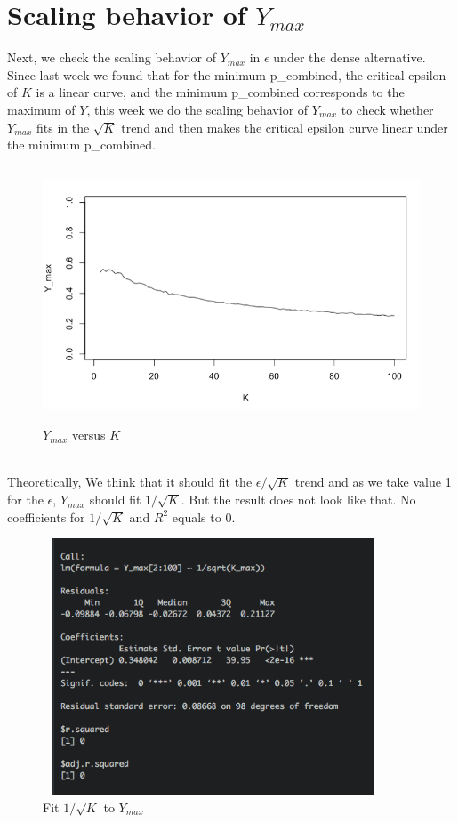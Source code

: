 \documentclass[10pt,english]{article}\usepackage{graphicx, color}
\numberwithin{equation}{section}
\numberwithin{figure}{section}
\begin{document}
\section{Scaling behavior of $Y_{max}$}
Next, we check the scaling behavior of $Y_{max}$ in $\epsilon$ under the dense alternative. Since last week we found that for the minimum p\_combined, the critical epsilon of $K$ is a linear curve, and the minimum p\_combined corresponds to the maximum of $Y$, this week we do the scaling behavior of $Y_{max}$ to check whether $Y_{max}$ fits in the $\sqrt{K}$ trend and then makes the critical epsilon curve linear under the minimum p\_combined.
\begin{figure}[htbp]
\centering\includegraphics[width=4.5in, height=3in]{max}
\caption{$Y_{max}$ versus $K$}
\end{figure}
\quad\\
Theoretically, We think that it should fit the $\epsilon/\sqrt{K}$ trend and as we take value 1 for the $\epsilon$, $Y_{max}$ should fit $1/\sqrt{K}$. But the result does not look like that. No coefficients for $1/\sqrt{K}$ and $R^2$ equals to 0.\\
\begin{figure}[htbp]
\centering\includegraphics[width=4in, height=3in]{sqrt}
\caption{Fit $1/\sqrt{K}$ to $Y_{max}$}
\end{figure}
\end{document}

